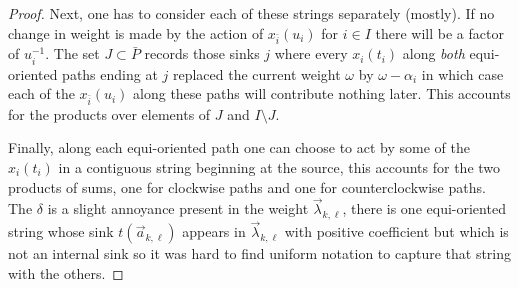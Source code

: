 \documentclass[11pt]{amsart}
\numberwithin{equation}{section}
\begin{document}
{\begin{proof}
    Next, one has to consider each of these strings separately (mostly).  If no change in weight is made by the action of $x_{\bar{i}}(u_i)$ for $i\in I$ there will be a factor of $u_i^{-1}$.  The set $J\subset\bar{P}$ records those sinks $j$ where every $x_i(t_i)$ along \emph{both} equi-oriented paths ending at $j$ replaced the current weight $\omega$ by $\omega-\alpha_i$ in which case each of the $x_{\bar{i}}(u_i)$ along these paths will contribute nothing later.  This accounts for the products over elements of $J$ and $I\setminus J$.

    Finally, along each equi-oriented path one can choose to act by some of the $x_i(t_i)$ in a contiguous string beginning at the source, this accounts for the two products of sums, one for clockwise paths and one for counterclockwise paths.  The $\delta$ is a slight annoyance present in the weight $\vec{\lambda}_{k,\ell}$, there is one equi-oriented string whose sink $t(\vec{a}_{k,\ell})$ appears in $\vec{\lambda}_{k,\ell}$ with positive coefficient but which is not an internal sink so it was hard to find uniform notation to capture that string with the others.
  \end{proof}}%
\end{document}
